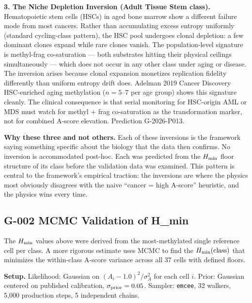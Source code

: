 \documentclass[12pt,a4paper]{article}
\begin{document}
\textbf{3. The Niche Depletion Inversion (Adult Tissue Stem class).}
Hematopoietic stem cells (HSCs) in aged bone marrow show a different failure
mode from most cancers. Rather than accumulating excess entropy uniformly
(standard cycling-class pattern), the HSC pool undergoes clonal depletion:
a few dominant clones expand while rare clones vanish. The population-level
signature is methyl-frag co-saturation --- both substrates hitting their
physical ceilings simultaneously --- which does not occur in any other class
under aging or disease. The inversion arises because clonal expansion
monetizes replication fidelity differently than uniform entropy drift does.
Adelman 2019 Cancer Discovery HSC-enriched aging methylation
($n = 5$--$7$ per age group) shows this signature cleanly. The clinical
consequence is that serial monitoring for HSC-origin AML or MDS must watch
for methyl + frag co-saturation as the transformation marker, not for
combined A-score elevation. Prediction G-2026-P013.

\textbf{Why these three and not others.} Each of these inversions is the
framework saying something specific about the biology that the data then
confirms. No inversion is accommodated post-hoc. Each was predicted from the
$H_{\rm min}$ floor structure of its class before the validation data was
examined. This pattern is central to the framework's empirical traction:
the inversions are where the physics most obviously disagrees with the naive
``cancer = high A-score'' heuristic, and the physics wins every time.

\subsection{G-002 MCMC Validation of H\_min}
\label{subsec:g002}

The $H_{\rm min}$ values above were derived from the most-methylated single
reference cell per class. A more rigorous estimate uses MCMC to find the
$H_{\rm min}(\text{class})$ that minimizes the within-class A-score variance
across all 37 cells with defined floors.

\textbf{Setup.} Likelihood: Gaussian on $(A_i - 1.0)^2/\sigma_A^2$
for each cell $i$. Prior: Gaussian centered on published calibration,
$\sigma_{\rm prior} = 0.05$. Sampler: \texttt{emcee}, 32 walkers,
5,000 production steps, 5 independent chains.
\end{document}
